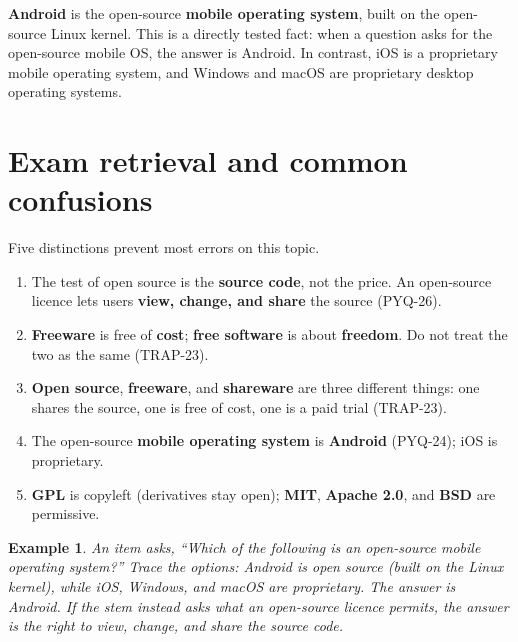 \documentclass[11pt]{article}
\newtheorem{example}{Example}[section]
\begin{document}
\textbf{Android} is the open-source \textbf{mobile operating system}, built on
the open-source Linux kernel. This is a directly tested fact: when a question
asks for the open-source mobile OS, the answer is Android. In contrast, iOS is
a proprietary mobile operating system, and Windows and macOS are proprietary
desktop operating systems.

\section{Exam retrieval and common confusions}
Five distinctions prevent most errors on this topic.
\begin{enumerate}
  \item The test of open source is the \textbf{source code}, not the price. An
    open-source licence lets users \textbf{view, change, and share} the source
    (PYQ-26).
  \item \textbf{Freeware} is free of \textbf{cost}; \textbf{free software} is
    about \textbf{freedom}. Do not treat the two as the same (TRAP-23).
  \item \textbf{Open source}, \textbf{freeware}, and \textbf{shareware} are
    three different things: one shares the source, one is free of cost, one is
    a paid trial (TRAP-23).
  \item The open-source \textbf{mobile operating system} is \textbf{Android}
    (PYQ-24); iOS is proprietary.
  \item \textbf{GPL} is copyleft (derivatives stay open); \textbf{MIT},
    \textbf{Apache 2.0}, and \textbf{BSD} are permissive.
\end{enumerate}

\begin{example}
An item asks, ``Which of the following is an open-source mobile operating
system?'' Trace the options: Android is open source (built on the Linux
kernel), while iOS, Windows, and macOS are proprietary. The answer is Android.
If the stem instead asks what an open-source licence permits, the answer is the
right to view, change, and share the source code.
\end{example}
\end{document}
